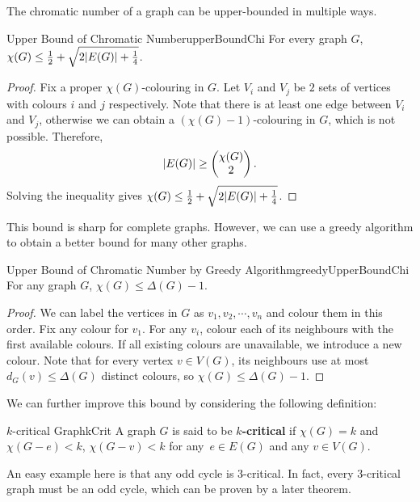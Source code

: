 \documentclass[math]{amznotes}
\theoremstyle{remark}
\begin{document}
The chromatic number of a graph can be upper-bounded in multiple ways.
\begin{probox}{Upper Bound of Chromatic Number}{upperBoundChi}
    For every graph $G$, $\chi(G) \leq \frac{1}{2} + \sqrt{2{\left\lvert {E(G)} \right\rvert} + \frac{1}{4}}$.
    \tcblower
    \begin{proof}
        Fix a proper $\chi(G)$-colouring in $G$. Let $V_i$ and $V_j$ be $2$ sets of vertices with colours $i$ and $j$ respectively. Note that there is at least one edge between $V_i$ and $V_j$, otherwise we can obtain a $(\chi(G) - 1)$-colouring in $G$, which is not possible. Therefore, 
        \begin{equation*}
            {\left\lvert {E(G)} \right\rvert} \geq \begin{pmatrix}
                \chi(G) \\
                2
            \end{pmatrix}.
        \end{equation*}
        Solving the inequality gives $\chi(G) \leq \frac{1}{2} + \sqrt{2{\left\lvert {E(G)} \right\rvert} + \frac{1}{4}}$.
    \end{proof}
\end{probox}
This bound is sharp for complete graphs. However, we can use a greedy algorithm to obtain a better bound for many other graphs.
\begin{probox}{Upper Bound of Chromatic Number by Greedy Algorithm}{greedyUpperBoundChi}
    For any graph $G$, $\chi(G) \leq \Delta(G) - 1$.
    \tcblower
    \begin{proof}
        We can label the vertices in $G$ as $v_1, v_2, \cdots, v_n$ and colour them in this order. Fix any colour for $v_1$. For any $v_i$, colour each of its neighbours with the first available colours. If all existing colours are unavailable, we introduce a new colour. Note that for every vertex $v \in V(G)$, its neighbours use at most $d_G(v) \leq \Delta(G)$ distinct colours, so $\chi(G) \leq \Delta(G) - 1$.
    \end{proof}
\end{probox}
We can further improve this bound by considering the following definition:
\begin{dfnbox}{$k$-critical Graph}{kCrit}
    A graph $G$ is said to be {\color{red} \textbf{$k$-critical}} if $\chi(G) = k$ and $\chi(G - e) < k$, $\chi(G - v) < k$ for any~$e \in E(G)$ and any $v \in V(G)$.
\end{dfnbox}
An easy example here is that any odd cycle is $3$-critical. In fact, every $3$-critical graph must be an odd cycle, which can be proven by a later theorem.
\end{document}
